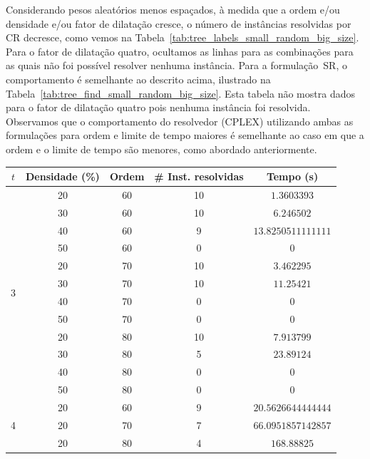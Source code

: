 Considerando pesos aleatórios menos espaçados, à medida que a ordem
e/ou densidade e/ou fator de dilatação cresce, o número de instâncias
resolvidas por CR
decresce, como vemos na
Tabela~\ref{tab:tree_labels_small_random_big_size}.  Para o fator de
dilatação quatro, ocultamos as linhas para as combinações para as quais
não foi possível resolver nenhuma instância. Para a formulação~SR, o
comportamento é semelhante ao descrito acima, ilustrado na
Tabela~\ref{tab:tree_find_small_random_big_size}. Esta tabela não
mostra dados para o fator de dilatação quatro pois nenhuma instância foi
resolvida.  Observamos que o comportamento do resolvedor (CPLEX)
utilizando ambas as formulações
para ordem e limite de tempo maiores é semelhante ao caso em que a
ordem e o limite de tempo são menores, como abordado anteriormente.

\begin{center}
\noindent
\footnotesize{
\begin{tabular}{|c|c|c|c|c|}\hline
{$t$} & {Densidade (\%)} & {Ordem} & {\# Inst. resolvidas} & {Tempo (s)}
\\ \hline\hline
\multirow{12}{*}{3}	&	20	&	60	&	10	&	$\num{1,3603393}$	\\
	&	30	&	60	&	10	&	$\num{6,246502}$	\\
	&	40	&	60	&	9	&	$\num{13,8250511111111}$	\\
	&	50	&	60	&	0	&	0	\\
	&	20	&	70	&	10	&	$\num{3,462295}$	\\
	&	30	&	70	&	10	&	$\num{11,25421}$	\\
	&	40	&	70	&	0	&	0	\\
	&	50	&	70	&	0	&	0	\\
	&	20	&	80	&	10	&	$\num{7,913799}$	\\
	&	30	&	80	&	5	&	$\num{23,89124}$	\\
	&	40	&	80	&	0	&	0	\\
&	50	&	80	&	0	&	0	\\
\hline
\multirow{3}{*}{4}	&	20	&	60	&	9	&	$\num{20,5626644444444}$	\\
	&	20	&	70	&	7	&	$\num{66,0951857142857}$	\\
	&	20	&	80	&	4	&	$\num{168,88825}$	\\
\hline\hline
\end{tabular}
}
\label{tab:tree_labels_small_random_big_size}
\end{center}


